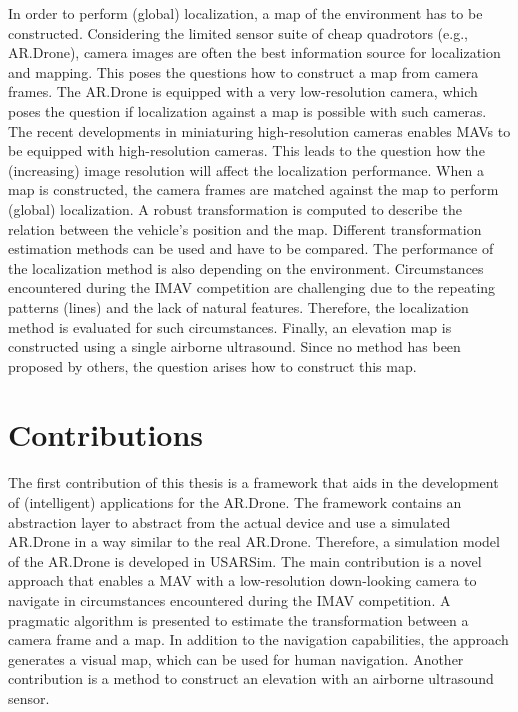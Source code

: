 In order to perform (global) localization, a map of the environment has to be constructed.
Considering the limited sensor suite of cheap quadrotors (e.g., AR.Drone), camera images are often the best information source for localization and mapping.
This poses the questions how to construct a map from camera frames.
The AR.Drone is equipped with a very low-resolution camera, which poses the question if localization against a map is possible with such cameras.
The recent developments in miniaturing high-resolution cameras enables MAVs to be equipped with high-resolution cameras.
This leads to the question how the (increasing) image resolution will affect the localization performance.
When a map is constructed, the camera frames are matched against the map to perform (global) localization.
A robust transformation is computed to describe the relation between the vehicle's position and the map.
Different transformation estimation methods can be used and have to be compared.
The performance of the localization method is also depending on the environment.
Circumstances encountered during the IMAV competition are challenging due to the repeating patterns (lines) and the lack of natural features.
Therefore, the localization method is evaluated for such circumstances.
Finally, an elevation map is constructed using a single airborne ultrasound.
Since no method has been proposed by others, the question arises how to construct this map.





\section{Contributions}
The first contribution of this thesis is a framework that aids in the development of (intelligent) applications for the AR.Drone.
The framework contains an abstraction layer to abstract from the actual device and use a simulated AR.Drone in a way similar to the real AR.Drone.
Therefore, a simulation model of the AR.Drone is developed in USARSim.
The main contribution is a novel approach that enables a MAV with a low-resolution down-looking camera to navigate in circumstances encountered during the IMAV competition.
A pragmatic algorithm is presented to estimate the transformation between a camera frame and a map.
In addition to the navigation capabilities, the approach generates a visual map, which can be used for human navigation.
Another contribution is a method to construct an elevation with an airborne ultrasound sensor.


